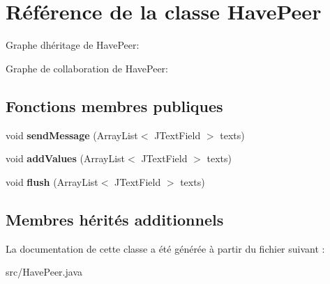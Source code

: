 \hypertarget{classHavePeer}{}\section{Référence de la classe Have\+Peer}
\label{classHavePeer}


Graphe d\textquotesingle{}héritage de Have\+Peer\+:


Graphe de collaboration de Have\+Peer\+:
\subsection*{Fonctions membres publiques}
\begin{DoxyCompactItemize}
\item 
\mbox{\label{classHavePeer_a8a8668efc9c577b607570748a516b164}} 
void {\bfseries send\+Message} (Array\+List$<$ J\+Text\+Field $>$ texts)
\item 
\mbox{\label{classHavePeer_a249f8a6f2fc9bc70a159e291946219c2}} 
void {\bfseries add\+Values} (Array\+List$<$ J\+Text\+Field $>$ texts)
\item 
\mbox{\label{classHavePeer_a1a2efdb33d58bdc07b3a931fe644ca7d}} 
void {\bfseries flush} (Array\+List$<$ J\+Text\+Field $>$ texts)
\end{DoxyCompactItemize}
\subsection*{Membres hérités additionnels}


La documentation de cette classe a été générée à partir du fichier suivant \+:\begin{DoxyCompactItemize}
\item 
src/Have\+Peer.\+java\end{DoxyCompactItemize}

